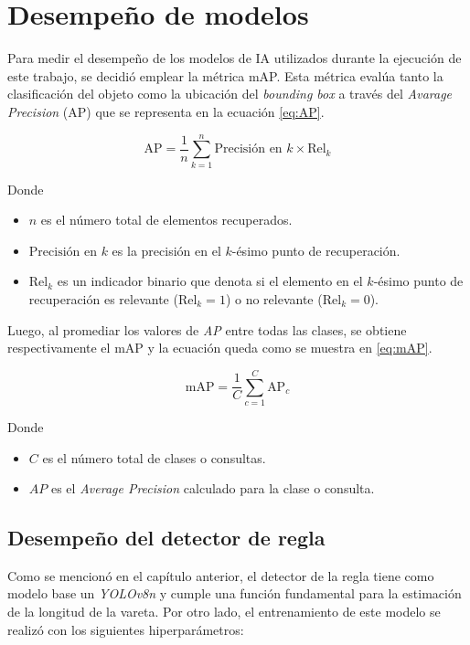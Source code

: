 \section{Desempeño de modelos}
\label{sec:desempeñoMod}

Para medir el desempeño de los modelos de IA utilizados durante la ejecución de este trabajo, se decidió emplear la métrica mAP. Esta métrica evalúa tanto la clasificación del objeto como la ubicación del \textit{bounding box} a través del \textit{Avarage Precision} (AP) que se representa en la ecuación \ref{eq:AP}.

\begin{equation}
    \label{eq:AP}
    \text{AP} = \frac{1}{n} \sum_{k=1}^n \text{Precisión en } k \times \text{Rel}_{k}
\end{equation}

Donde
\begin{itemize}
    \item \( n \) es el número total de elementos recuperados.
    \item \(\text{Precisión en } k\) es la precisión en el \( k \)-ésimo punto de recuperación.
    \item \(\text{Rel}_{k}\) es un indicador binario que denota si el elemento en el \( k \)-ésimo punto de recuperación es relevante (\( \text{Rel}_{k} = 1 \)) o no relevante (\( \text{Rel}_{k} = 0 \)).
\end{itemize}

Luego, al promediar los valores de \textit{AP} entre todas las clases, se obtiene respectivamente el mAP y la ecuación queda como se muestra en \ref{eq:mAP}.

\begin{equation}
    \label{eq:mAP}
    \text{mAP} = \frac{1}{C} \sum_{c=1}^C \text{AP}_c
\end{equation}

Donde 
\begin{itemize}
	\item \( C \) es el número total de clases o consultas.
    \item \( AP \) es el \textit{Average Precision} calculado para la clase o consulta.
\end{itemize}

\subsection{Desempeño del detector de regla}

Como se mencionó en el capítulo anterior, el detector de la regla tiene como modelo base un \textit{YOLOv8n} y cumple una función fundamental para la estimación de la longitud de la vareta. Por otro lado, el entrenamiento de este modelo se realizó con los siguientes hiperparámetros:

